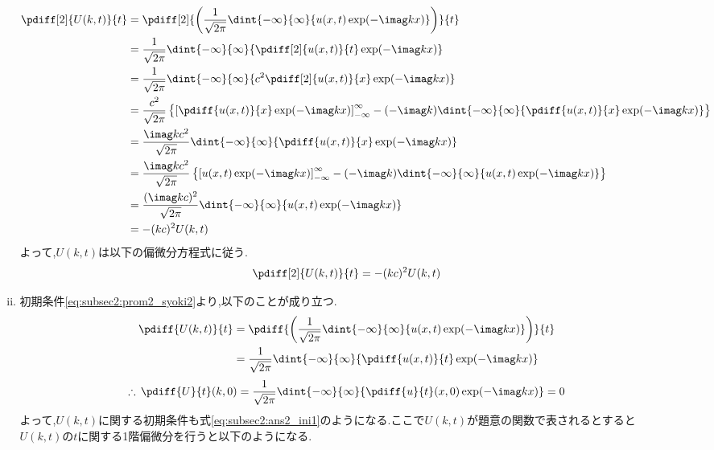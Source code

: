 \documentclass[dvipdfmx,titlepage, 11pt, a4paper]{jsarticle}%
\begin{document}
\begin{enumerate}[(1)]
\begin{enumerate}[(i)]
\begin{align*}
            \pdiff[2]{U(k, t)}{t} 
            & = \pdiff[2]{\left(\frac{1}{\sqrt{2\pi}}\dint{-\infty}{\infty}{u(x, t)\exp(-\imag kx)}\right)}{t}\\
            & = \frac{1}{\sqrt{2\pi}}\dint{-\infty}{\infty}{\pdiff[2]{u(x, t)}{t}\exp(-\imag kx)}\\
            & = \frac{1}{\sqrt{2\pi}}\dint{-\infty}{\infty}{c^{2}\pdiff[2]{u(x, t)}{x}\exp(-\imag kx)}\\
            & = \frac{c^{2}}{\sqrt{2\pi}}\left\{\left[\pdiff{u(x, t)}{x}\exp(-\imag kx)\right]_{-\infty}^{\infty} - (-\imag k)\dint{-\infty}{\infty}{\pdiff{u(x, t)}{x}\exp(-\imag kx)}\right\}\\
            & = \frac{\imag kc^{2}}{\sqrt{2\pi}}\dint{-\infty}{\infty}{\pdiff{u(x, t)}{x}\exp(-\imag kx)}\\
            & = \frac{\imag kc^{2}}{\sqrt{2\pi}}\left\{\left[u(x, t)\exp(-\imag kx)\right]_{-\infty}^{\infty} - (-\imag k)\dint{-\infty}{\infty}{u(x, t)\exp(-\imag kx)}\right\}\\
            & = \frac{(\imag kc)^{2}}{\sqrt{2\pi}}\dint{-\infty}{\infty}{u(x, t)\exp(-\imag kx)}\\
            & = -(kc)^{2}U(k, t)
        \end{align*}
        よって,$U(k, t)$は以下の偏微分方程式に従う.
        \begin{equation}
            \pdiff[2]{U(k, t)}{t} = -(kc)^{2}U(k, t)\label{eq:subsec2:ans1}
        \end{equation}
        \item 初期条件\eqref{eq:subsec2:prom2_syoki2}より,以下のことが成り立つ.
        \begin{align*}
            \pdiff{U(k, t)}{t} 
            & = \pdiff{\left(\frac{1}{\sqrt{2\pi}}\dint{-\infty}{\infty}{u(x, t)\exp(-\imag kx)}\right)}{t}\\
            & = \frac{1}{\sqrt{2\pi}}\dint{-\infty}{\infty}{\pdiff{u(x, t)}{t}\exp(-\imag kx)}\\
        \end{align*}
        \begin{equation}
            \therefore\, \pdiff{U}{t}(k, 0) 
             = \frac{1}{\sqrt{2\pi}}\dint{-\infty}{\infty}{\pdiff{u}{t}(x, 0)\exp(-\imag kx)} = 0\label{eq:subsec2:ans2_ini1}
        \end{equation}
        よって,$U(k, t)$に関する初期条件も式\eqref{eq:subsec2:ans2_ini1}のようになる.ここで$U(k, t)$が題意の関数で表されるとすると
        $U(k, t)$の$t$に関する1階偏微分を行うと以下のようになる.

\end{enumerate}
\end{enumerate}
\end{document}
